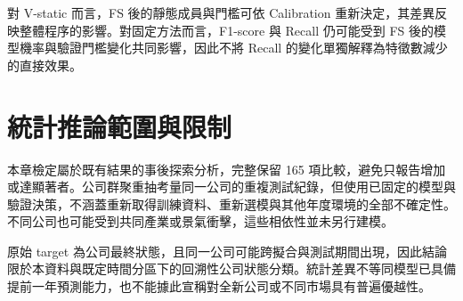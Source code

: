 對 V-static 而言，FS 後的靜態成員與門檻可依 Calibration 重新決定，其差異反映整體程序的影響。對固定方法而言，F1-score 與 Recall 仍可能受到 FS 後的模型機率與驗證門檻變化共同影響，因此不將 Recall 的變化單獨解釋為特徵數減少的直接效果。

\section{統計推論範圍與限制}

本章檢定屬於既有結果的事後探索分析，完整保留 165 項比較，避免只報告增加或達顯著者。公司群聚重抽考量同一公司的重複測試紀錄，但使用已固定的模型與驗證決策，不涵蓋重新取得訓練資料、重新選模與其他年度環境的全部不確定性。不同公司也可能受到共同產業或景氣衝擊，這些相依性並未另行建模。

原始 target 為公司最終狀態，且同一公司可能跨擬合與測試期間出現，因此結論限於本資料與既定時間分區下的回溯性公司狀態分類。統計差異不等同模型已具備提前一年預測能力，也不能據此宣稱對全新公司或不同市場具有普遍優越性。
\endgroup
